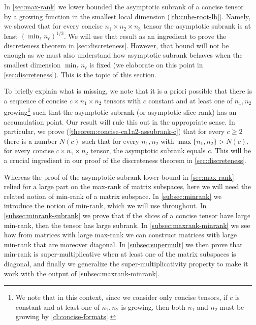 \documentclass{daj}
\begin{document}
%
%

%

In \autoref{sec:max-rank} %
we lower bounded the asymptotic subrank of a concise tensor by a growing function in the smallest local dimension (\autoref{th:cube-root-lb}). Namely, we showed that for every concise $n_1 \times n_2 \times n_3$ tensor the asymptotic subrank is at least $(\min_\ell n_\ell)^{1/3}$. 
We will use that result as an ingredient to prove the discreteness theorem in \autoref{sec:discreteness}. However, that bound will not be enough as we must also understand how asymptotic subrank behaves when the smallest dimension $\min_\ell n_\ell$ is fixed (we elaborate on this point in \autoref{sec:discreteness}). This is the topic of this section.

To briefly explain what is missing, we note that it is a priori possible that there is a sequence of concise $c \times n_1 \times n_2$ tensors with $c$ constant and at least one of $n_1, n_2$ growing\footnote{We note that in this context, since we consider only concise tensors, if $c$ is constant and at least one of $n_1, n_2$ is growing, then both $n_1$ and $n_2$ must be growing by \autoref{cl:concise-formats}.}
such that the asymptotic subrank (or asymptotic slice rank) has an accumulation point. Our result will rule this out in the appropriate sense. In particular, we prove (\autoref{theorem:concise-cn1n2-assubrank-c}) that for every $c \geq 2$ there is a number $N(c)$ such that for every $n_1, n_2$ with $\max \{n_1, n_2\} > N(c)$,
for every concise $c \times n_1 \times n_2$ tensor, the asymptotic subrank equals $c$. This will be a crucial ingredient in our proof of the discreteness theorem in \autoref{sec:discreteness}.



%

%
Whereas the proof of the asymptotic subrank lower bound in \autoref{sec:max-rank} relied for a large part on the max-rank of matrix subspaces, here we will need the related notion of min-rank of a matrix subspace.
In \autoref{subsec:minrank} we introduce the notion of min-rank, which we will use throughout. In \autoref{subsec:minrank-subrank} we prove that if the slices of a concise tensor have large min-rank, then the tensor has large subrank. In \autoref{subsec:maxrank-minrank} we see how from matrices with large max-rank we can construct matrices with large min-rank that are moreover diagonal. In \autoref{subsec:supermult} we then prove that min-rank is super-multiplicative when at least one of the matrix subspaces is diagonal, and finally we generalize the super-multiplicativity property to make it work with the output of \autoref{subsec:maxrank-minrank}.
\end{document}

